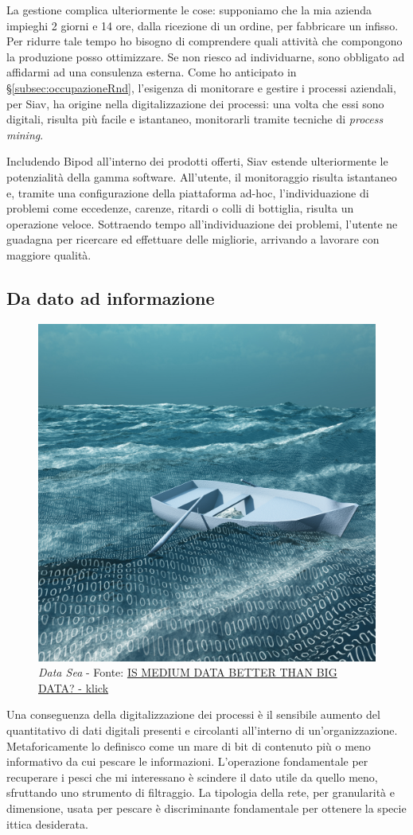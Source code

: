 La gestione complica ulteriormente le cose: supponiamo che la mia azienda impieghi 2 giorni e 14 ore, dalla ricezione di un ordine, per fabbricare un infisso. Per ridurre tale tempo ho bisogno di comprendere quali attività che compongono la produzione posso ottimizzare. Se non riesco ad individuarne, sono obbligato ad affidarmi ad una consulenza esterna.
Come ho anticipato in \S\ref{subsec:occupazioneRnd}, l'esigenza di monitorare e gestire i processi aziendali, per Siav, ha origine nella digitalizzazione dei processi: una volta che essi sono digitali, risulta più facile e istantaneo, monitorarli tramite tecniche di \textit{process mining}.

Includendo Bipod all'interno dei prodotti offerti, Siav estende ulteriormente le potenzialità della gamma software.
All'utente, il monitoraggio risulta istantaneo e, tramite una configurazione della piattaforma ad-hoc, l'individuazione di problemi come eccedenze, carenze, ritardi o colli di bottiglia, risulta un operazione veloce. Sottraendo tempo all'individuazione dei problemi, l'utente ne guadagna per ricercare ed effettuare delle migliorie, arrivando a lavorare con maggiore qualità.

\subsection{Da dato ad informazione}
\begin{figure}[H]
    \centering
    \includegraphics[width=0.50\columnwidth]{immagini/bigData.jpg}
    \caption{\textit{Data Sea} - Fonte: \href{https://www.klick.com/health/news/blog/strategy/is-medium-data-better-than-big-data/}{IS MEDIUM DATA BETTER THAN BIG DATA? - klick}}
    \label{fig:dataSea}
\end{figure}

Una conseguenza della digitalizzazione dei processi è il sensibile aumento del quantitativo di dati digitali presenti e circolanti all'interno di un'organizzazione. Metaforicamente lo definisco come un mare di bit di contenuto più o meno informativo da cui pescare le informazioni. L'operazione fondamentale per recuperare i pesci che mi interessano è scindere il dato utile da quello meno, sfruttando uno strumento di filtraggio.
La tipologia della rete, per granularità e dimensione, usata per pescare è discriminante fondamentale per ottenere la specie ittica desiderata.
